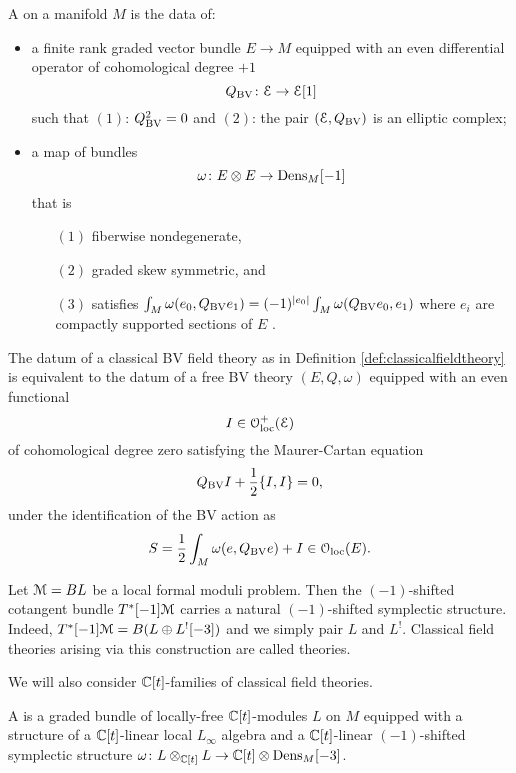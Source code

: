 \documentclass[10pt, oneside]{article}
\begin{document}
\begin{definition}
A  on a manifold $M$ is the data of:
\begin{itemize}
\item a finite rank graded vector bundle $E \to M$ equipped with an even differential operator of cohomological degree $+1$
\[
Q_{\mathrm{BV}} \colon \mathcal E \to \mathcal E [1] 
\]
such that $(1)$: $Q_{\mathrm{BV}}^2 = 0$ and $(2)$: the pair $(\mathcal E , Q_{\mathrm{BV}})$ is an elliptic complex;
\item a map of bundles
\[
\omega\colon E \otimes E \to \mathrm{Dens}_M [-1]
\]
that is
\begin{enumerate}
\item[$(1)$] fiberwise nondegenerate,
\item[$(2)$] graded skew symmetric, and
\item[$(3)$] satisfies $\int_M \omega(e_0, Q_{\mathrm{BV}} e_1) = (-1)^{|e_0|} \int_M \omega(Q_{\mathrm{BV}} e_0, e_1)$ where $e_i$ are compactly supported sections of $E$ .
\end{enumerate}
\end{itemize}
\end{definition}

\begin{remark} \label{classical_BV_from_free_BV}
The datum of a classical BV field theory as in Definition \ref{def:classicalfieldtheory} is equivalent to the datum of a free BV theory $(E, Q, \omega)$ equipped with an even functional
\[I \in \mathcal{O}_{\rm loc}^+(\mathcal E)\]
of cohomological degree zero satisfying the Maurer-Cartan equation
\[Q_{\mathrm{BV}} I + \frac{1}{2} \{I,I\} = 0,\]
under the identification of the BV action as
\[S = \frac{1}{2} \int_M \omega(e, Q_{\mathrm{BV}} e) + I\in \mathcal{O}_{\rm loc}(E).\]
\end{remark}

\begin{example} \label{def:cotangent_type}
Let $\mathcal M=BL$ be a local formal moduli problem. Then the $(-1)$-shifted cotangent bundle $T^*[-1]\mathcal M$ carries a natural $(-1)$-shifted symplectic structure. Indeed, $T^*[-1]\mathcal M = B(L\oplus L^![-3])$ and we simply pair $L$ and $L^!$. Classical field theories arising via this construction are called  theories.
\end{example}

We will also consider $\mathbb C[t]$-families of classical field theories.
\begin{definition} \label{family_of_BV_theories_def}
A  is a graded bundle of locally-free $\mathbb C[t]$-modules $L$ on $M$ equipped with a structure of a $\mathbb C[t]$-linear local $L_\infty$ algebra and a $\mathbb C[t]$-linear $(-1)$-shifted symplectic structure $\omega\colon L\otimes_{\mathbb C[t]} L\rightarrow \mathbb C[t]\otimes \mathrm{Dens}_M[-3]$.
\end{definition}
\end{document}
